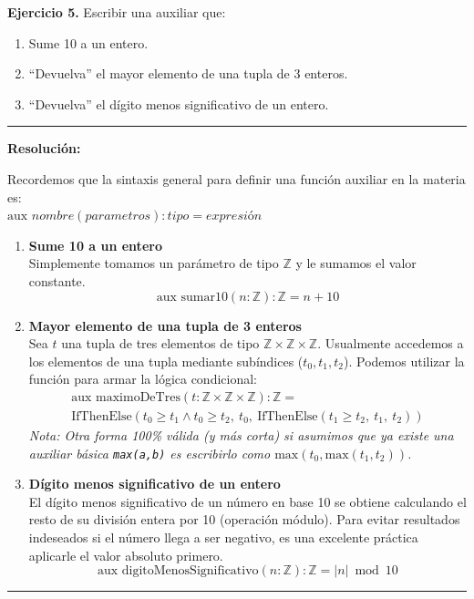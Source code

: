 \hypertarget{ej5}{}
\noindent \textbf{Ejercicio 5.} Escribir una auxiliar que:

\begin{enumerate}[label=\alph*)]
    \item Sume 10 a un entero.
    \item ``Devuelva'' el mayor elemento de una tupla de 3 enteros.
    \item ``Devuelva'' el dígito menos significativo de un entero.
\end{enumerate}

\vspace{0.2cm}
{\color{gray}\hrule}
\vspace{0.4cm}

\textbf{Resolución:}

Recordemos que la sintaxis general para definir una función auxiliar en la materia es: \\
$\text{aux } \textit{nombre}(\textit{parametros}): \textit{tipo} = \textit{expresión}$

\begin{enumerate}[label=\textbf{\alph*)}]

    \item \textbf{Sume 10 a un entero} \\
    Simplemente tomamos un parámetro de tipo $\mathbb{Z}$ y le sumamos el valor constante.
    \[ \text{aux sumar10}(n: \mathbb{Z}): \mathbb{Z} = n + 10 \]

    \vspace{0.4cm}
    \item \textbf{Mayor elemento de una tupla de 3 enteros} \\
    Sea $t$ una tupla de tres elementos de tipo $\mathbb{Z} \times \mathbb{Z} \times \mathbb{Z}$. Usualmente accedemos a los elementos de una tupla mediante subíndices ($t_0, t_1, t_2$). Podemos utilizar la función  para armar la lógica condicional:
    \begin{multline*}
    \text{aux maximoDeTres}(t: \mathbb{Z} \times \mathbb{Z} \times \mathbb{Z}): \mathbb{Z} = \\
    \text{IfThenElse}(t_0 \geq t_1 \wedge t_0 \geq t_2, \: t_0, \: \text{IfThenElse}(t_1 \geq t_2, \: t_1, \: t_2))
    \end{multline*}
    \textit{Nota: Otra forma 100\% válida (y más corta) si asumimos que ya existe una auxiliar básica \texttt{max(a,b)} es escribirlo como $\text{max}(t_0, \text{max}(t_1, t_2))$.}

    \vspace{0.4cm}
    \item \textbf{Dígito menos significativo de un entero} \\
    El dígito menos significativo de un número en base 10 se obtiene calculando el resto de su división entera por 10 (operación módulo). Para evitar resultados indeseados si el número llega a ser negativo, es una excelente práctica aplicarle el valor absoluto primero.
    \[ \text{aux digitoMenosSignificativo}(n: \mathbb{Z}): \mathbb{Z} = |n| \bmod 10 \]
    
\end{enumerate}

\vspace{0.5cm}
\hrule
\vspace{0.5cm}